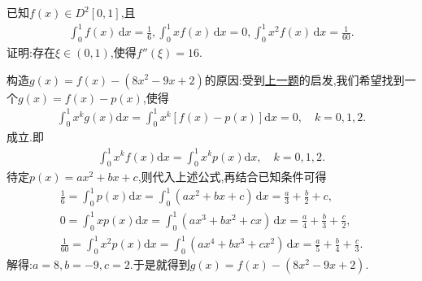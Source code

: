 \documentclass[../../main.tex]{subfiles}%
\begin{document}
\begin{example}
已知$f(x)\in D^2[0,1]$,且
\begin{align*}
\int_0^1{f\left( x \right)\,\mathrm{d}x}=\frac{1}{6},\int_0^1{xf\left( x \right)\,\mathrm{d}x}=0,\int_0^1{x^2f\left( x \right)\,\mathrm{d}x}=\frac{1}{60}.
\end{align*}
证明:存在$\xi \in (0,1)$,使得$f''(\xi)=16$.
\end{example}
\begin{note}
构造$g(x)=f(x)-(8x^2 - 9x + 2)$的原因:受到\hyperref[proposition:x^kf积分为0则f至少有n+1个零点]{上一题}的启发,我们希望找到一个$g(x)=f(x)-p(x)$,使得
\begin{align*}
\int_0^1 x^k g(x)\mathrm{d}x =\int_0^1 x^k [f(x)-p(x)]\mathrm{d}x = 0, \quad k = 0,1,2.
\end{align*}
成立.即
\begin{align*}
\int_0^1{x^kf(x)\mathrm{d}x}=\int_0^1{x^kp(x)\mathrm{d}x},\quad k=0,1,2.
\end{align*}
待定$p(x)=ax^2+bx+c$,则代入上述公式,再结合已知条件可得
\begin{gather*}
\frac{1}{6}=\int_0^1{p(x)\mathrm{d}x}=\int_0^1{\left( ax^2+bx+c \right)\,\mathrm{d}x}=\frac{a}{3}+\frac{b}{2}+c,
\\
0=\int_0^1{xp(x)\mathrm{d}x}=\int_0^1{\left( ax^3+bx^2+cx \right)\,\mathrm{d}x}=\frac{a}{4}+\frac{b}{3}+\frac{c}{2},
\\
\frac{1}{60}=\int_0^1{x^2p(x)\mathrm{d}x}=\int_0^1{\left( ax^4+bx^3+cx^2 \right)\,\mathrm{d}x}=\frac{a}{5}+\frac{b}{4}+\frac{c}{3}.
\end{gather*}
解得:$a=8,b=-9,c=2$.于是就得到\(g(x)=f(x)-(8x^2 - 9x + 2)\).
\end{note}
\end{document}
